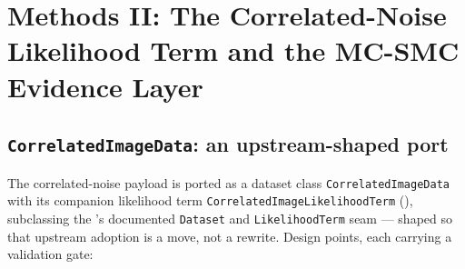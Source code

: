\section{Methods II: The Correlated-Noise Likelihood Term and the MC-SMC
Evidence Layer}
\label{sec:port-a}

\subsection{\texttt{CorrelatedImageData}: an upstream-shaped port}
\label{sec:corr-port-a}

The correlated-noise payload is ported as a dataset class
\texttt{CorrelatedImageData} with its companion likelihood term
\texttt{Correlated\allowbreak Image\allowbreak Likelihood\allowbreak Term}
(), subclassing the \sceneapi's documented
\texttt{Dataset} and \texttt{LikelihoodTerm} seam --- shaped so that
upstream adoption is a move, not a rewrite. Design points, each carrying a
validation gate:

